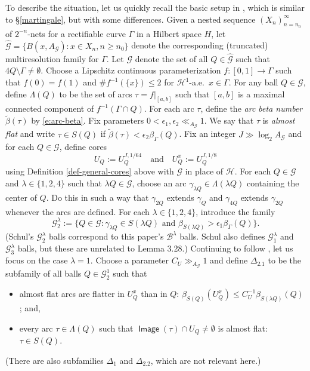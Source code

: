 \documentclass[12pt]{amsart}
\numberwithin{equation}{section}
\theoremstyle{plain}
\theoremstyle{definition}
\newcommand{\Haus}{\mathcal{H}}
\newcommand{\Image}{\mathop\mathsf{Image}\nolimits}
\numberwithin{figure}{section}
\begin{document}
To describe the situation, let us quickly recall the basic setup in \cite{Schul-Hilbert}, which is similar to \S\ref{martingale}, but with some differences. Given a nested sequence $(X_n)_{n=n_0}^\infty$ of $2^{-n}$-nets for a rectifiable curve $\Gamma$ in a Hilbert space $H$, let  $\hat{\mathscr{G}}=\{B(x,A_{\mathscr{G}}):x\in X_n,n\geq n_0\}$ denote the corresponding (truncated) multiresolution family for $\Gamma$. Let $\mathscr{G}$ denote the set of all $Q\in\hat{\mathscr{G}}$ such that $4Q\setminus\Gamma\neq\emptyset$. Choose a Lipschitz continuous parameterization $f:[0,1]\rightarrow \Gamma$ such that $f(0)=f(1)$ and $\#f^{-1}(\{x\})\leq 2$ for $\Haus^1$-a.e.~$x\in\Gamma$. For any ball $Q\in\mathscr{G}$, define $\Lambda(Q)$ to be the set of arcs $\tau=f|_{[a,b]}$ such that $[a,b]$ is a maximal connected component of $f^{-1}(\Gamma\cap Q)$. For each arc $\tau$, define the \emph{arc beta number} $\tilde\beta(\tau)$ by \eqref{e:arc-beta}. Fix parameters $0<\epsilon_1,\epsilon_2\ll_{A_\mathscr{G}} 1$. We say that $\tau$ is \emph{almost flat} and write $\tau\in S(Q)$ if $\tilde\beta(\tau)<\epsilon_2 \beta_\Gamma(Q)$. Fix an integer $J\gg \log_2 A_\mathscr{G}$ and for each $Q\in\mathscr{G}$, define cores $$U_Q:=U_Q^{J,1/64}\quad\text{and}\quad U_Q^x:=U_Q^{J,1/8}$$ using Definition \ref{def-general-cores} above with $\mathscr{G}$ in place of $\mathscr{H}$. For each $Q\in\mathscr{G}$ and $\lambda\in\{1,2,4\}$ such that $\lambda Q\in\mathscr{G}$, choose an arc $\gamma_{\lambda Q}\in\Lambda(\lambda Q)$ containing the center of $Q$. Do this in such a way that $\gamma_{2Q}$ extends $\gamma_Q$ and $\gamma_{4Q}$ extends $\gamma_{2Q}$ whenever the arcs are defined. For each $\lambda\in\{1,2,4\}$, introduce the family  $$\mathscr{G}_2^\lambda:=\{Q\in\mathscr{G}:\gamma_{\lambda Q}\in S(\lambda Q)\text{ and }\beta_{S(\lambda Q)}>\epsilon_1\beta_\Gamma(Q)\}.$$ (Schul's $\mathscr{G}_2^\lambda$ balls correspond to this paper's $\mathscr{B}^\lambda$ balls. Schul also defines $\mathscr{G}_1^\lambda$ and $\mathscr{G}_3^\lambda$ balls, but these are unrelated to Lemma 3.28.) Continuing to follow \cite{Schul-Hilbert}, let us focus on the case $\lambda=1$. Choose a parameter $C_U\gg_{A_\mathscr{G}} 1$ and define  $\Delta_{2.1}$ to be the subfamily of all balls $Q\in\mathscr{G}_2^1$ such that \begin{itemize}
\item almost flat arcs are flatter in $U_Q^x$ than in $Q$: $\beta_{S(Q)}(U_Q^x)\leq C_U^{-1}\beta_{S(\lambda Q)}(Q)$; and,
\item every arc $\tau\in\Lambda(Q)$ such that $\Image(\tau)\cap U_Q\neq\emptyset$ is almost flat: $\tau\in S(Q)$.\end{itemize}
(There are also subfamilies $\Delta_1$ and $\Delta_{2.2}$, which are not relevant here.)
\end{document}

